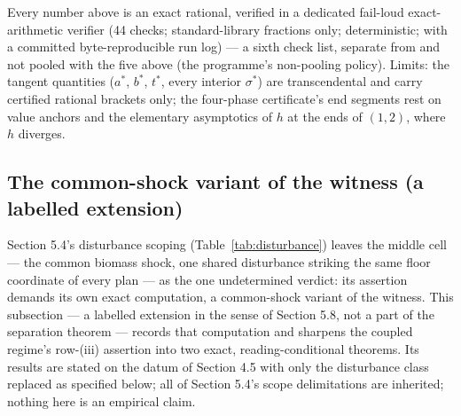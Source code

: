 \documentclass[3p,11pt]{elsarticle}
\begin{document}
Every number above is an exact rational, verified in a dedicated
fail-loud exact-arithmetic verifier (44 checks; standard-library
fractions only; deterministic; with a committed byte-reproducible run
log) --- a sixth check list, separate from and not pooled with the
five above (the programme's non-pooling policy). Limits: the tangent quantities (\(a^{*}\), \(b^{*}\), \(t^{*}\),
every interior \(\sigma^{*}\)) are transcendental and carry certified
rational brackets only; the four-phase certificate's end segments
rest on value anchors and the elementary asymptotics of \(h\) at the
ends of \((1,2)\), where \(h\) diverges.

\subsection{The common-shock variant of the witness (a
labelled extension)}\label{common-shock-variant}

Section 5.4's disturbance scoping (Table~\ref{tab:disturbance}) leaves the
middle cell --- the common biomass shock, one shared disturbance striking
the same floor coordinate of every plan --- as the one undetermined
verdict: its assertion demands its own exact computation, a common-shock
variant of the witness. This subsection --- a labelled extension in the
sense of Section 5.8, not a part of the separation theorem --- records
that computation and sharpens the coupled regime's row-(iii)
assertion into two exact, reading-conditional theorems. Its results are
stated on the datum of Section 4.5 with only the disturbance class
replaced as specified below; all of Section 5.4's scope delimitations are
inherited; nothing here is an empirical claim.
\end{document}
